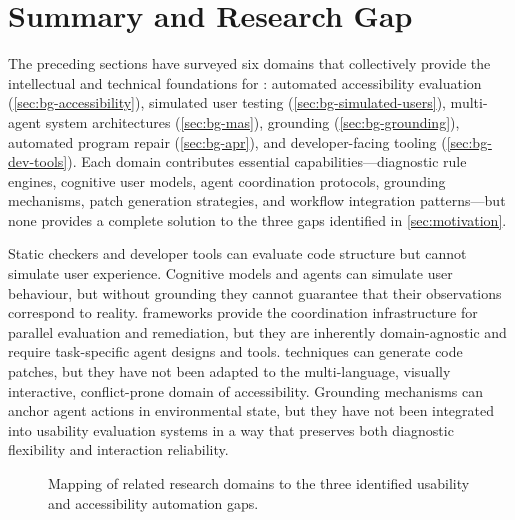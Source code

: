 \section{Summary and Research Gap}
\label{sec:bg-gap}

The preceding sections have surveyed six domains that collectively provide the intellectual and technical foundations for \versimux{}: automated accessibility evaluation (\cref{sec:bg-accessibility}), simulated user testing (\cref{sec:bg-simulated-users}), multi-agent system architectures (\cref{sec:bg-mas}),  grounding (\cref{sec:bg-grounding}), automated program repair (\cref{sec:bg-apr}), and developer-facing tooling (\cref{sec:bg-dev-tools}). Each domain contributes essential capabilities---diagnostic rule engines, cognitive user models, agent coordination protocols, grounding mechanisms, patch generation strategies, and workflow integration patterns---but none provides a complete solution to the three gaps identified in \cref{sec:motivation}.

Static checkers and developer tools can evaluate code structure but cannot simulate user experience. Cognitive models and  agents can simulate user behaviour, but without grounding they cannot guarantee that their observations correspond to reality.  frameworks provide the coordination infrastructure for parallel evaluation and remediation, but they are inherently domain-agnostic and require task-specific agent designs and tools.  techniques can generate code patches, but they have not been adapted to the multi-language, visually interactive, conflict-prone domain of  accessibility. Grounding mechanisms can anchor agent actions in environmental state, but they have not been integrated into usability evaluation systems in a way that preserves both diagnostic flexibility and interaction reliability.

\begin{figure}[htbp]
  \centering
  \caption{Mapping of related research domains to the three identified usability and accessibility automation gaps.}
  \label{fig:bg-gaps-mapping}
\end{figure}

